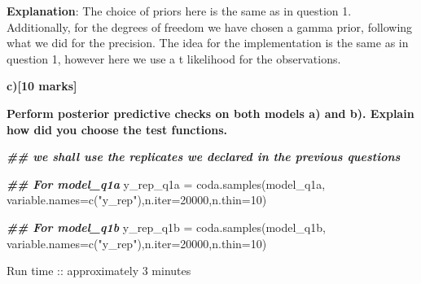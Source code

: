 \documentclass[
]{article}
\newenvironment{Shaded}{\begin{snugshade}}{\end{snugshade}}
\newcommand{\AttributeTok}[1]{\textcolor[rgb]{0.77,0.63,0.00}{#1}}
\newcommand{\DecValTok}[1]{\textcolor[rgb]{0.00,0.00,0.81}{#1}}
\newcommand{\DocumentationTok}[1]{\textcolor[rgb]{0.56,0.35,0.01}{\textbf{\textit{#1}}}}
\newcommand{\FunctionTok}[1]{\textcolor[rgb]{0.00,0.00,0.00}{#1}}
\newcommand{\NormalTok}[1]{#1}
\newcommand{\OtherTok}[1]{\textcolor[rgb]{0.56,0.35,0.01}{#1}}
\newcommand{\StringTok}[1]{\textcolor[rgb]{0.31,0.60,0.02}{#1}}
\begin{document}
\textbf{Explanation}: The choice of priors here is the same as in
question 1. Additionally, for the degrees of freedom we have chosen a
gamma prior, following what we did for the precision. The idea for the
implementation is the same as in question 1, however here we use a t
likelihood for the observations.

\textbf{c){[}10 marks{]}}

\textbf{Perform posterior predictive checks on both models a) and b).
Explain how did you choose the test functions.}

\begin{Shaded}
\begin{Highlighting}[]
\DocumentationTok{\#\# we shall use the replicates we declared in the previous questions}

\DocumentationTok{\#\# For model\_q1a}
\NormalTok{y\_rep\_q1a }\OtherTok{=} \FunctionTok{coda.samples}\NormalTok{(model\_q1a, }\AttributeTok{variable.names=}\FunctionTok{c}\NormalTok{(}\StringTok{"y\_rep"}\NormalTok{),}\AttributeTok{n.iter=}\DecValTok{20000}\NormalTok{,}\AttributeTok{n.thin=}\DecValTok{10}\NormalTok{)}

\DocumentationTok{\#\# For model\_q1b}
\NormalTok{y\_rep\_q1b }\OtherTok{=} \FunctionTok{coda.samples}\NormalTok{(model\_q1b, }\AttributeTok{variable.names=}\FunctionTok{c}\NormalTok{(}\StringTok{"y\_rep"}\NormalTok{),}\AttributeTok{n.iter=}\DecValTok{20000}\NormalTok{,}\AttributeTok{n.thin=}\DecValTok{10}\NormalTok{)}
\end{Highlighting}
\end{Shaded}

Run time :: approximately 3 minutes
\end{document}
